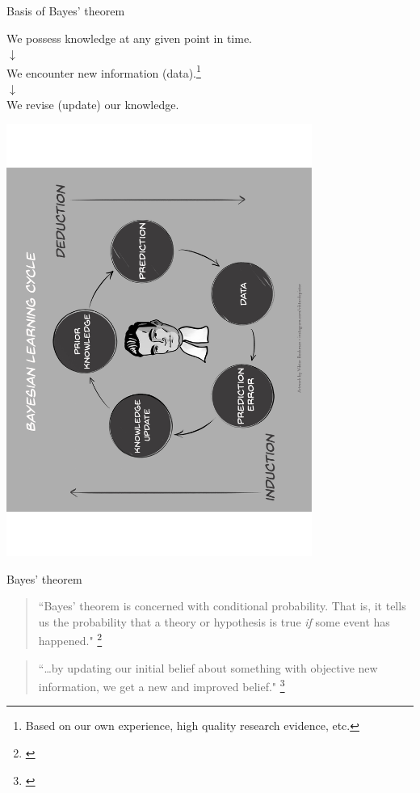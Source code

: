 \documentclass{beamer}
\begin{document}
% 
\begin{frame}{Basis of Bayes' theorem}
	\begin{center}
	We possess knowledge at any given point in time. \\
	$\downarrow$ \\ 
	We encounter new information (data).\footnote{\tiny{Based on our own experience, high quality research evidence, etc.}} \\
	$\downarrow$ \\ 
	We revise (update) our knowledge. 
	\end{center}
\end{frame}

% 
\begin{frame}{} 
	\begin{center}
	\includegraphics[angle=270, width=10cm]{images/BayesianLearningCycle.pdf}
	\end{center}	
\end{frame}

%
\begin{frame}{Bayes' theorem}
	\begin{quote} 
	``Bayes' theorem is concerned with conditional probability. That is, it tells us the probability that a theory or hypothesis is true \emph{if} some event has happened." \footnote{\tiny{\citet[p. 243]{Silver2012}}}
	\end{quote}
	
	\begin{quote}
	``\dots by updating our initial belief about something with objective new information, we get a new and improved belief." \footnote{\tiny{\citet[p. xi]{McGrayne2011}}}
	\end{quote}
\end{frame}
\end{document}
